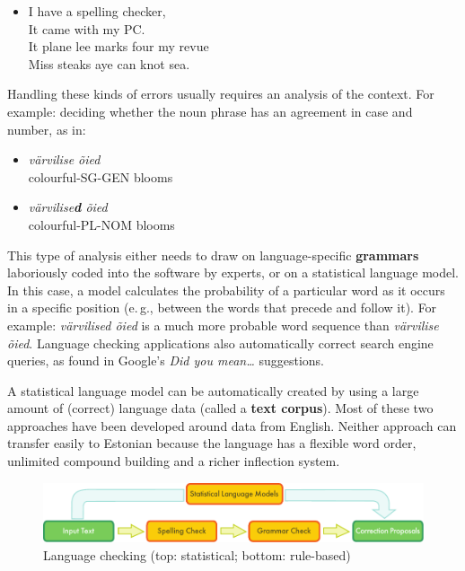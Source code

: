 \begin{multicols}{2}
\begin{itemize}
\item[]  I have a spelling checker,\\
  It came with my PC.\\
  It plane lee marks four my revue\\
  Miss steaks aye can knot sea.
\end{itemize}

Handling these kinds of errors usually requires an analysis of the context. For example: deciding whether the noun phrase has an agreement in case and number, as in:

\begin{itemize}
\item \textit {värvilise õied}\\ 
 colourful-SG-GEN blooms
\item \textit {värvilise\textbf{d} õied}\\
 colourful-PL-NOM blooms
\end{itemize}

This type of analysis either needs to draw on language-specific \textbf{grammars} laboriously coded into the software by experts, or on a statistical language model.  In this case, a model calculates the probability of a particular word as it occurs in a specific position (e.\,g., between the words that precede and follow it).  For example: \textit{värvilised õied} is a much more probable word sequence than \textit{värvilise õied}.  Language checking applications also automatically correct search engine queries, as found in Google's \textit{Did you mean…} suggestions.

A statistical language model can be automatically created by using a large amount of (correct) language data (called a \textbf{text corpus}). 
Most of these two approaches have been developed around data from English. 
Neither approach can transfer easily to Estonian because the language has a flexible word order, unlimited compound building and a richer inflection system. 

\begin{figure}[htb]
  \center
  \includegraphics[width=\textwidth]{../_media/english/language_checking}
  \caption{Language checking (top: statistical; bottom: rule-based)}
\label{fig:langcheckingaarch_en}
\end{figure}


\end{multicols}
